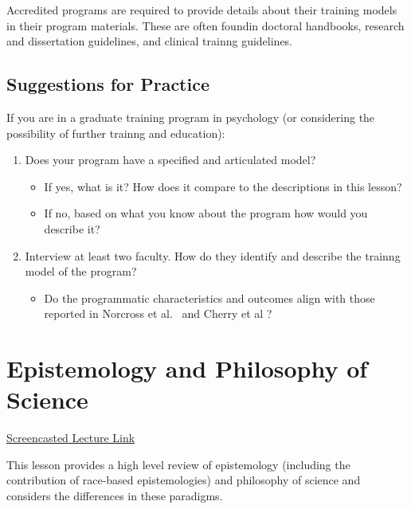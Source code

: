\documentclass[
  english,
]{book}
\providecommand{\tightlist}{%
  \setlength{\itemsep}{0pt}\setlength{\parskip}{0pt}}
\begin{document}
Accredited programs are required to provide details about their training models in their program materials. These are often foundin doctoral handbooks, research and dissertation guidelines, and clinical trainng guidelines.

\hypertarget{suggestions-for-practice}{%
\section{Suggestions for Practice}\label{suggestions-for-practice}}

If you are in a graduate training program in psychology (or considering the possibility of further trainng and education):

\begin{enumerate}
\def\labelenumi{\arabic{enumi}.}
\tightlist
\item
  Does your program have a specified and articulated model?

  \begin{itemize}
  \tightlist
  \item
    If yes, what is it? How does it compare to the descriptions in this lesson?
  \item
    If no, based on what you know about the program how would you describe it?
  \end{itemize}
\item
  Interview at least two faculty. How do they identify and describe the trainng model of the program?

  \begin{itemize}
  \tightlist
  \item
    Do the programmatic characteristics and outcomes align with those reported in Norcross et al.~\citeyearpar{norcross_doctoral_2020} and Cherry et al \citeyearpar{cherry_examination_2000}?
  \end{itemize}
\end{enumerate}

\hypertarget{PHoS}{%
\chapter{Epistemology and Philosophy of Science}\label{PHoS}}

\href{HTTPS://SPU.HOSTED.PANOPTO.COM/PANOPTO/PAGES/VIEWER.ASPX?PID=E521F3D0-BE61-4099-A108-AC40003B45E2}{Screencasted Lecture Link}

This lesson provides a high level review of epistemology (including the contribution of race-based epistemologies) and philosophy of science and considers the differences in these paradigms.
\end{document}
